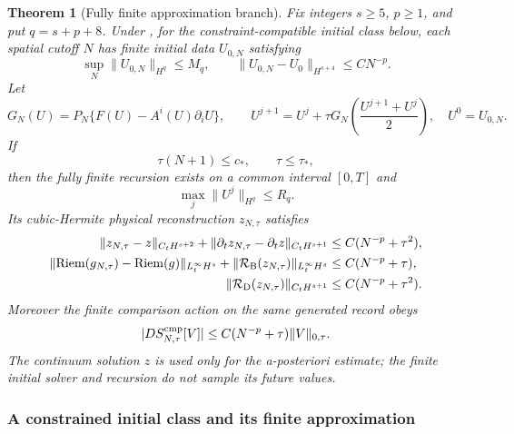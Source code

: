 \documentclass[11pt]{article}
\numberwithin{equation}{section}
\newtheorem{theorem}{Theorem}[section]
\theoremstyle{definition}
\theoremstyle{remark}
\newcommand{\Riem}{\operatorname{Riem}}
\newcommand{\norm}[1]{\lVert#1\rVert}
\begin{document}
\begin{theorem}[Fully finite approximation branch]
\label{thm:generated-dynamics}
Fix integers $s\ge5$, $p\ge1$, and put $q=s+p+8$.  Under , for the constraint-compatible initial class below, each spatial cutoff $N$ has finite initial data $U_{0,N}$ satisfying
\begin{equation}
 \sup_N\norm{U_{0,N}}_{H^q}\le M_q,
 \qquad
 \norm{U_{0,N}-U_0}_{H^{s+4}}\le C N^{-p}.
 \label{eq:generated-initial-rate}
\end{equation}
Let
\begin{equation}
 G_N(U)=P_N\{F(U)-A^i(U)\partial_iU\},
 \qquad
 U^{j+1}=U^j+\tau G_N\!\left(\frac{U^{j+1}+U^j}{2}\right),
 \quad U^0=U_{0,N}.
 \label{eq:generated-midpoint}
\end{equation}
If
\begin{equation}
 \tau(N+1)\le c_*,\qquad \tau\le\tau_*,
 \label{eq:generated-CFL}
\end{equation}
then the fully finite recursion exists on a common interval $[0,T]$ and
\begin{equation}
 \max_j\norm{U^j}_{H^q}\le R_q.
 \label{eq:generated-uniform}
\end{equation}
Its cubic-Hermite physical reconstruction $z_{N,\tau}$ satisfies
\begin{align}
 \norm{z_{N,\tau}-z}_{C_tH^{s+2}}
 +\norm{\partial_tz_{N,\tau}-\partial_tz}_{C_tH^{s+1}}
 &\le C(N^{-p}+\tau^2),\label{eq:generated-first}\\
 \norm{\Riem(g_{N,\tau})-\Riem(g)}_{L^\infty_tH^s}
 +\norm{\mathcal R_{\rm B}(z_{N,\tau})}_{L^\infty_tH^s}
 &\le C(N^{-p}+\tau),\label{eq:generated-bosonic}\\
 \norm{\mathcal R_{\rm D}(z_{N,\tau})}_{C_tH^{s+1}}
 &\le C(N^{-p}+\tau^2).\label{eq:generated-Dirac}
\end{align}
Moreover the finite comparison action on the same generated record obeys
\begin{equation}
 |D S^{\rm cmp}_{N,\tau}[V]|
 \le C(N^{-p}+\tau)\norm V_{0,\tau}.
 \label{eq:generated-stationarity}
\end{equation}
The continuum solution $z$ is used only for the a-posteriori estimate; the finite initial solver and recursion do not sample its future values.
\end{theorem}

\subsubsection{A constrained initial class and its finite approximation}
\end{document}
